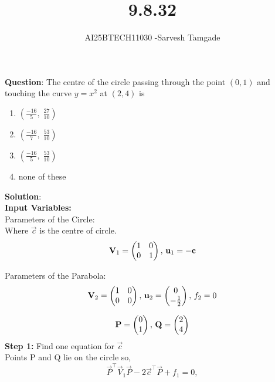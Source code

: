\documentclass[journal]{IEEEtran}
\begin{document}

\vspace{3cm}

\title{9.8.32}
\author{AI25BTECH11030 -Sarvesh Tamgade}
{\let\newpage\relax\maketitle}

\renewcommand{\thefigure}{\theenumi}
\renewcommand{\thetable}{\theenumi}
\setlength{\intextsep}{10pt} 


\renewcommand{\thetable}{\theenumi}


\textbf{Question}:
The centre of the circle passing through the point $(0,1)$ and touching the curve $y = x^2$ at $(2,4)$ is

\begin{enumerate}[label=(\alph*)]
\item $\left(\frac{-16}{5},\; \frac{27}{10}\right)$
\item $\left(\frac{-16}{7},\; \frac{53}{10}\right)$
\item $\left(\frac{-16}{5},\; \frac{53}{10}\right)$
\item none of these
\end{enumerate}

\textbf{Solution}: \\
\textbf{Input Variables:  }\\
Parameters of the Circle:\\
Where $\vec{c}$ is the centre of circle.
\begin{equation}
\mathbf{V}_1 = \begin{pmatrix}1 & 0 \\ 0 & 1\end{pmatrix}, \, \mathbf{u}_1 = -\mathbf{c}
\end{equation}

Parameters of the Parabola:
\begin{equation}
\mathbf{V}_2 = \begin{pmatrix}1 & 0 \\ 0 & 0\end{pmatrix}, \, \mathbf{u}_2 = \begin{pmatrix}0 \\ -\frac{1}{2}\end{pmatrix}, \, f_2 = 0
\end{equation}

\begin{equation}
\mathbf{P} = \begin{pmatrix}0 \\ 1\end{pmatrix}, \, \mathbf{Q}= \begin{pmatrix}2 \\ 4\end{pmatrix}
\end{equation}
\textbf{Step 1:} Find one equation for $\vec{c}$\\
Points P and Q lie on the circle so,
\begin{equation}
\vec{P}^\top \vec{V}_1 \vec{P} - 2 \vec{c}^\top \vec{P} + f_1 = 0,
\end{equation}
\end{document}
